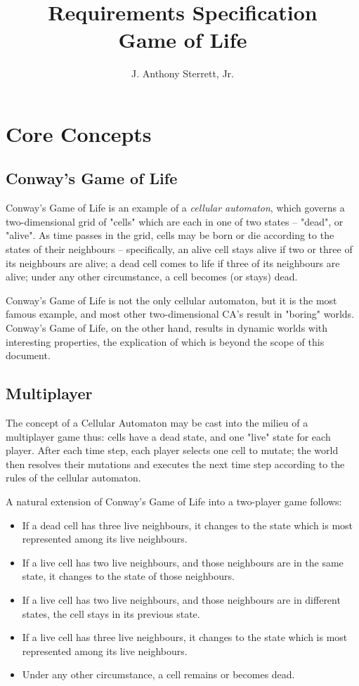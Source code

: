 \documentclass[letterpaper]{article}
\title{Requirements Specification \\ Game of Life}
\author{J. Anthony Sterrett, Jr.}
\date{}
\begin{document}
\maketitle

\section{Core Concepts}

\subsection{Conway's Game of Life}

Conway's Game of Life is an example of a \emph{cellular automaton}, which governs a two-dimensional grid of "cells" which are each in one of two states -- "dead", or "alive". As time passes in the grid, cells may be born or die according to the states of their neighbours -- specifically, an alive cell stays alive if two or three of its neighbours are alive; a dead cell comes to life if three of its neighbours are alive; under any other circumstance, a cell becomes (or stays) dead.

Conway's Game of Life is not the only cellular automaton, but it is the most famous example, and most other two-dimensional CA's result in "boring" worlds. Conway's Game of Life, on the other hand, results in dynamic worlds with interesting properties, the explication of which is beyond the scope of this document.

\subsection{Multiplayer}

The concept of a Cellular Automaton may be cast into the milieu of a multiplayer game thus: cells have a dead state, and one "live" state for each player. After each time step, each player selects one cell to mutate; the world then resolves their mutations and executes the next time step according to the rules of the cellular automaton.

A natural extension of Conway's Game of Life into a two-player game follows:

\begin{itemize}
	\item If a dead cell has three live neighbours, it changes to the state which is most represented among its live neighbours.
	\item If a live cell has two live neighbours, and those neighbours are in the same state, it changes to the state of those neighbours.
	\item If a live cell has two live neighbours, and those neighbours are in different states, the cell stays in its previous state.
	\item If a live cell has three live neighbours, it changes to the state which is most represented among its live neighbours.
	\item Under any other circumstance, a cell remains or becomes dead.
\end{itemize}
\end{document}
